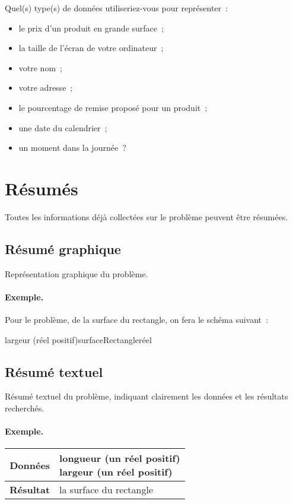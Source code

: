 			Quel(s) type(s) de données utiliseriez-vous pour représenter~:
			\begin{itemize}
				\item le prix d’un produit en grande surface~;
				\item la taille de l’écran de votre ordinateur~;
				\item votre nom~;
				\item votre adresse~;
				\item le pourcentage de remise proposé pour un produit~;
				\item une date du calendrier~;
				\item un moment dans la journée~?
			\end{itemize}
			
	\section{Résumés}
	
		Toutes les informations déjà collectées sur le problème
		peuvent être résumées. 
		
		\subsection{Résumé graphique}
		
		Représentation graphique du problème.
	
		\begin{Emphase}
			\paragraph{Exemple.}
			Pour le problème, de la surface du rectangle, 
			on fera le schéma suivant~:
			
			\center{}
			{largeur (réel positif)}{surfaceRectangle}{réel}	
		\end{Emphase}

		\subsection{Résumé textuel}

		Résumé textuel du problème, indiquant clairement les données et les 
		résultats recherchés. 

		\begin{Emphase}
			\paragraph{Exemple.}
			\begin{tabular}[t]{|>{\columncolor{black!40}}r|l|}
				\hline
				\textbf{Données} & \makecell[tl]{
					longueur (un réel positif)\\
					largeur (un réel positif)
				}\\
				\hline
				\textbf{Résultat} & la surface du rectangle\\
				\hline
			\end{tabular}
		\end{Emphase}
		
